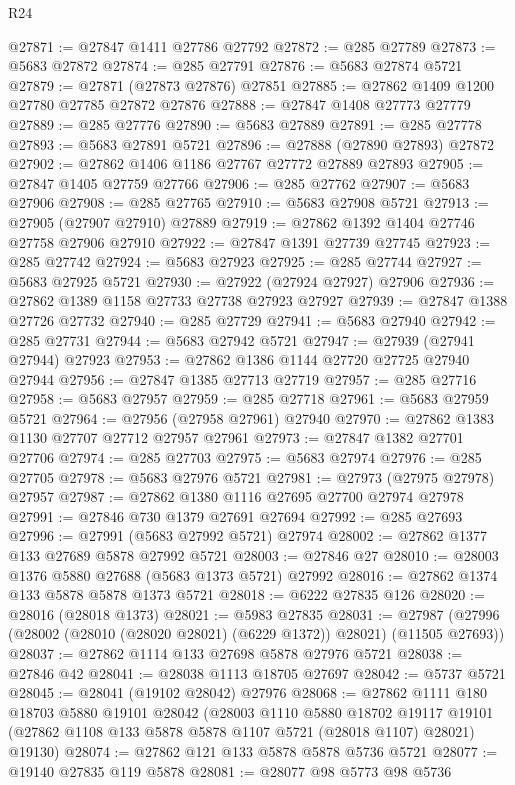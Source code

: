 \begin{lexlean}{R24}
\begin{coremodule}
@27871 := @27847 @1411 @27786 @27792
@27872 := @285 @27789
@27873 := @5683 @27872
@27874 := @285 @27791
@27876 := @5683 @27874 @5721
@27879 := @27871 (@27873 @27876) @27851
@27885 := @27862 @1409 @1200 @27780 @27785 @27872 @27876
@27888 := @27847 @1408 @27773 @27779
@27889 := @285 @27776
@27890 := @5683 @27889
@27891 := @285 @27778
@27893 := @5683 @27891 @5721
@27896 := @27888 (@27890 @27893) @27872
@27902 := @27862 @1406 @1186 @27767 @27772 @27889 @27893
@27905 := @27847 @1405 @27759 @27766
@27906 := @285 @27762
@27907 := @5683 @27906
@27908 := @285 @27765
@27910 := @5683 @27908 @5721
@27913 := @27905 (@27907 @27910) @27889
@27919 := @27862 @1392 @1404 @27746 @27758 @27906 @27910
@27922 := @27847 @1391 @27739 @27745
@27923 := @285 @27742
@27924 := @5683 @27923
@27925 := @285 @27744
@27927 := @5683 @27925 @5721
@27930 := @27922 (@27924 @27927) @27906
@27936 := @27862 @1389 @1158 @27733 @27738 @27923 @27927
@27939 := @27847 @1388 @27726 @27732
@27940 := @285 @27729
@27941 := @5683 @27940
@27942 := @285 @27731
@27944 := @5683 @27942 @5721
@27947 := @27939 (@27941 @27944) @27923
@27953 := @27862 @1386 @1144 @27720 @27725 @27940 @27944
@27956 := @27847 @1385 @27713 @27719
@27957 := @285 @27716
@27958 := @5683 @27957
@27959 := @285 @27718
@27961 := @5683 @27959 @5721
@27964 := @27956 (@27958 @27961) @27940
@27970 := @27862 @1383 @1130 @27707 @27712 @27957 @27961
@27973 := @27847 @1382 @27701 @27706
@27974 := @285 @27703
@27975 := @5683 @27974
@27976 := @285 @27705
@27978 := @5683 @27976 @5721
@27981 := @27973 (@27975 @27978) @27957
@27987 := @27862 @1380 @1116 @27695 @27700 @27974 @27978
@27991 := @27846 @730 @1379 @27691 @27694
@27992 := @285 @27693
@27996 := @27991 (@5683 @27992 @5721) @27974
@28002 := @27862 @1377 @133 @27689 @5878 @27992 @5721
@28003 := @27846 @27
@28010 := @28003 @1376 @5880 @27688 (@5683 @1373 @5721) @27992
@28016 := @27862 @1374 @133 @5878 @5878 @1373 @5721
@28018 := @6222 @27835 @126
@28020 := @28016 (@28018 @1373)
@28021 := @5983 @27835
@28031 := @27987 (@27996 (@28002 (@28010 (@28020 @28021) (@6229 @1372)) @28021) (@11505 @27693))
@28037 := @27862 @1114 @133 @27698 @5878 @27976 @5721
@28038 := @27846 @42
@28041 := @28038 @1113 @18705 @27697
@28042 := @5737 @5721
@28045 := @28041 (@19102 @28042) @27976
@28068 := @27862
    @1111
    @180
    @18703
    @5880
    @19101
    @28042
    (@28003
      @1110
      @5880
      @18702
      @19117
      @19101
      (@27862 @1108 @133 @5878 @5878 @1107 @5721 (@28018 @1107) @28021)
      @19130)
@28074 := @27862 @121 @133 @5878 @5878 @5736 @5721
@28077 := @19140 @27835 @119 @5878
@28081 := @28077 @98 @5773 @98 @5736

\end{coremodule}
\end{lexlean}
